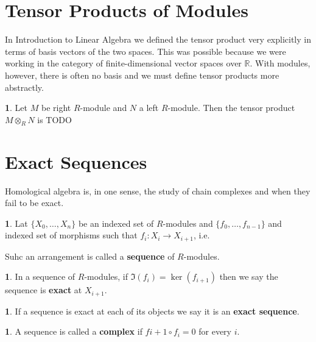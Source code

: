 \documentclass[oneside,english]{amsbook}
\numberwithin{section}{chapter}
\theoremstyle{plain}
\theoremstyle{definition}
\newtheorem{defn}[thm]{\protect\definitionname}
\providecommand{\definitionname}{Definition}
\begin{document}
	\section{Tensor Products of Modules}

		In Introduction to Linear Algebra we defined the tensor product very explicitly in terms of basis vectors of the two spaces. This was possible because we were working in the category of finite-dimensional vector spaces over $\mathbb{R}$. With modules, however, there is often no basis and we must define tensor products more abstractly.
		
		\begin{defn}
			Let $M$ be right $R$-module and $N$ a left $R$-module. Then the tensor product $M\otimes_R N$ is TODO
		\end{defn}

	\section{Exact Sequences}
	
		Homological algebra is, in one sense, the study of chain complexes and when they fail to be exact.
		
		\begin{defn}
			Lat $\{X_0,\ldots,X_n\}$ be an indexed set of $R$-modules and $\{f_0,\ldots,f_{n-1}\}$ and indexed set of morphisms such that $f_i:X_i\to X_{i+1}$, i.e. 
			\begin{center}
			\end{center}					
			Suhc an arrangement is called a \textbf{sequence} of $R$-modules.
		\end{defn}
		
		\begin{defn}
			In a sequence of $R$-modules, if $\Im(f_i) = \ker(f_{i+1})$ then we say the sequence is \textbf{exact} at $X_{i+1}$.
		\end{defn}

		\begin{defn}
			If a sequence is exact at each of its objects we say it is an \textbf{exact sequence}.
		\end{defn}
		
		\begin{defn}
			A sequence is called a \textbf{complex} if $f{i+1}\circ f_i = 0$ for every $i$.
		\end{defn}
		
\end{document}
